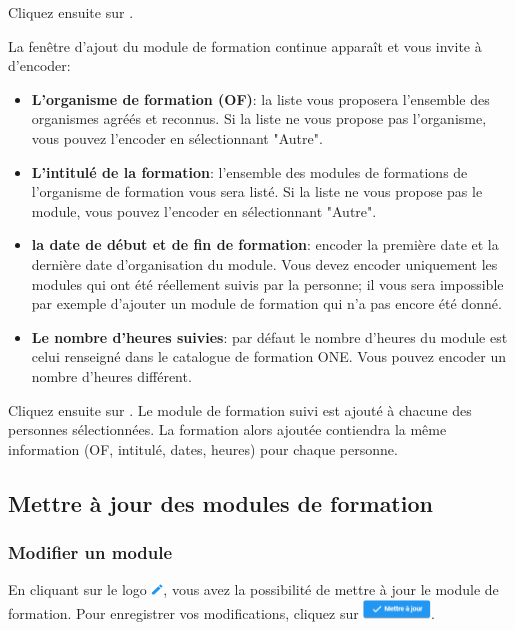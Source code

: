 Cliquez ensuite sur \ovalbox{\textcolor{vert}{Encoder des formations pour la sélection}}.

La fenêtre d'ajout du module de formation continue apparaît et vous invite à d'encoder:
\begin{itemize}
    \item \textbf{L'organisme de formation (OF)}: la liste vous proposera l'ensemble des organismes agréés et reconnus. Si la liste ne vous propose pas l'organisme, vous pouvez l'encoder en sélectionnant "Autre". 
    \item \textbf{L'intitulé de la formation}: l'ensemble des modules de formations de l'organisme de formation vous sera listé. Si la liste ne vous propose pas le module, vous pouvez l'encoder en sélectionnant "Autre". 
    \item \textbf{la date de début et de fin de formation}: encoder la première date et la dernière date d'organisation du module. Vous devez encoder uniquement les modules qui ont été réellement suivis par la personne; il vous sera impossible par exemple d'ajouter un module de formation qui n'a pas encore été donné.
    \item \textbf{Le nombre d'heures suivies}:  par défaut le nombre d'heures du module est celui renseigné dans le catalogue de formation ONE. Vous pouvez encoder un nombre d'heures différent. 
\end{itemize}

Cliquez ensuite sur .
Le module de formation suivi est ajouté à chacune des personnes sélectionnées. La formation alors ajoutée contiendra la même information (OF, intitulé, dates, heures) pour chaque personne. 


\subsection{Mettre à jour des modules de formation}
\subsubsection{Modifier un module}
En cliquant sur le logo \includegraphics[height=0.3cm]{Images/icon/icon-edit.png}, vous avez la possibilité de mettre à jour le module de formation. Pour enregistrer vos modifications, cliquez sur \includegraphics[height=0.5cm]{Images/icon/button-maj.png}.

